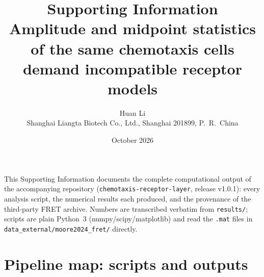\documentclass[11pt]{article}
\title{\bfseries Supporting Information\\[4pt]
\large Amplitude and midpoint statistics of the same chemotaxis cells\\
demand incompatible receptor models}
\author{Huan Li\\ \small Shanghai Liangta Biotech Co., Ltd., Shanghai 201899, P.\ R.\ China}
\date{October 2026}
\begin{document}
\maketitle

\noindent This Supporting Information documents the complete computational
output of the accompanying repository
(\texttt{chemotaxis-receptor-layer}, release v1.0.1): every analysis
script, the numerical results each produced, and the provenance of the
third-party FRET archive. Numbers are transcribed verbatim from
\texttt{results/}; scripts are plain Python~3 (numpy/scipy/matplotlib)
and read the \texttt{.mat} files in \texttt{data\_external/moore2024\_fret/}
directly.

\tableofcontents
\newpage

\section{Pipeline map: scripts and outputs}
\end{document}
